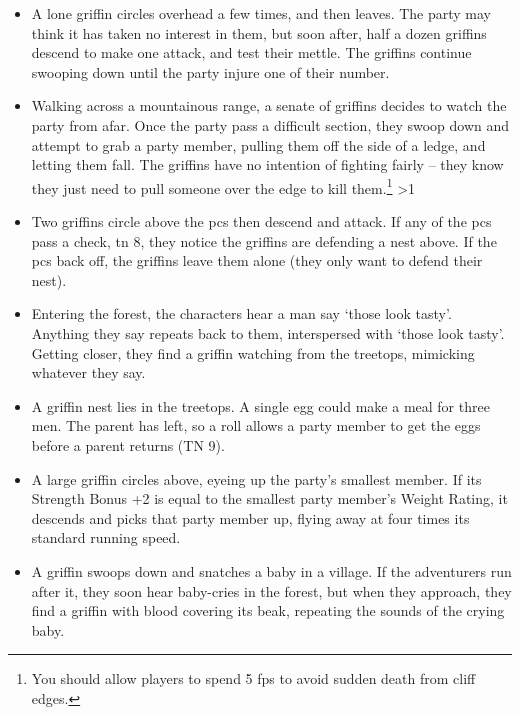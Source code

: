 \begin{multicols}{2}
\begin{itemize}
  \item
  A lone griffin circles overhead a few times, and then leaves.
  The party may think it has taken no interest in them, but soon after, half a dozen griffins descend to make one attack, and test their mettle.
  The griffins continue swooping down until the party injure one of their number.
  \item
  Walking across a mountainous range, a senate of griffins decides to watch the party from afar.
  Once the party pass a difficult section, they swoop down and attempt to grab a party member, pulling them off the side of a ledge, and letting them fall.
  The griffins have no intention of fighting fairly -- they know they just need to pull someone over the edge to kill them.\footnote{You should allow players to spend 5 \glspl{fp} to avoid sudden death from cliff edges.}
  \ifnum\value{temperature}>1
    \item
    Two griffins circle above the \glspl{pc} then descend and attack.
    If any of the \glspl{pc} pass a  check, \gls{tn} 8, they notice the griffins are defending a nest above.
    If the \glspl{pc} back off, the griffins leave them alone (they only want to defend their nest).
  \else
    \item
    Entering the forest, the characters hear a man say `those look tasty'.
    Anything they say repeats back to them, interspersed with `those look tasty'.
    Getting closer, they find a griffin watching from the treetops, mimicking whatever they say.
  \fi
  \item
  A griffin nest lies in the treetops.
  A single egg could make a meal for three men.
  The parent has left, so a  roll allows a party member to get the eggs before a parent returns (TN 9).
  \item
  A large griffin circles above, eyeing up the party's smallest member.
  If its Strength Bonus +2 is equal to the smallest party member's Weight Rating, it descends and picks that party member up, flying away at four times its standard running speed.
  \item
  A griffin swoops down and snatches a baby in a village.
  If the adventurers run after it, they soon hear baby-cries in the forest, but when they approach, they find a griffin with blood covering its beak, repeating the sounds of the crying baby.

\end{itemize}

\label{mouthdigger}


\end{multicols}
